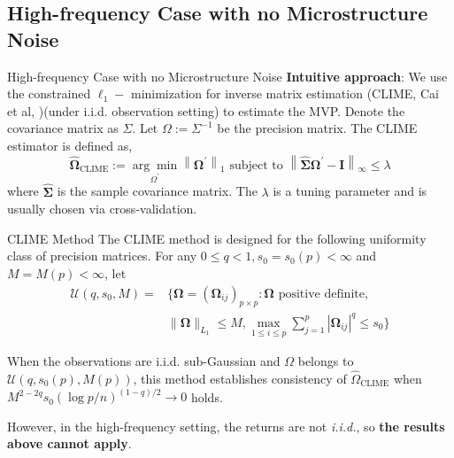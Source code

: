 \documentclass{beamer}
\begin{document}
\subsection{High-frequency Case with no Microstructure Noise}
\begin{frame}{High-frequency Case with no Microstructure Noise}
\textbf{Intuitive approach}: We use the constrained $\ell_1-$ minimization for inverse matrix estimation (CLIME, Cai et al, \cite{cai2011constrained})(under i.i.d. observation setting) to estimate the MVP. Denote the covariance matrix as $\Sigma$. Let $\Omega := \Sigma^{-1}$ be the precision matrix. The CLIME estimator is defined as,
\begin{equation}
\label{eqt:2-2}
    \widehat{\boldsymbol{\Omega}}_{\mathrm{CLIME}}:=\underset{\Omega^{\prime}}{\arg \min }\left\|\boldsymbol{\Omega}^{\prime}\right\|_1 \text { subject to }\left\|\widehat{\boldsymbol{\Sigma}} \boldsymbol{\Omega}^{\prime}-\mathbf{I}\right\|_{\infty} \leq \lambda
\end{equation}
where $\hat{\bm{\Sigma}}$ is the sample covariance matrix. The $\lambda$ is a tuning parameter and is usually chosen via cross-validation.
\end{frame}

\begin{frame}{CLIME Method}
The CLIME method is designed for the following uniformity class of precision matrices. For any $0\leq q < 1, s_0 = s_0(p)<\infty$ and $M=M(p)<\infty$, let
\begin{equation}
\label{eqt:2-3}
\begin{aligned}
\mathcal{U}\left(q, s_0, M\right)=
&\{\boldsymbol{\Omega}=\left(\boldsymbol{\Omega}_{i j}\right)_{p \times p}: \boldsymbol{\Omega} \text { positive definite, }\\
&\|\boldsymbol{\Omega}\|_{L_1} \leq M, \max _{1 \leq i \leq p} \sum_{j=1}^p\left|\boldsymbol{\Omega}_{i j}\right|^q \leq s_0\}
\end{aligned}
\end{equation}

When the observations are i.i.d. sub-Gaussian and $\Omega$ belongs to $\mathcal{U}(q, s_0(p), M(p))$, this method establishes consistency of $\hat{\Omega}_{\text{CLIME}}$ when $M^{2-2q}s_0(\log p/n)^{(1-q)/2}\to 0$ holds.
\newline

However, in the high-frequency setting, the returns are not \textit{i.i.d.}, so \textbf{the results above cannot apply}.
\end{frame}
\end{document}
